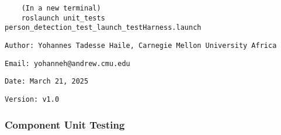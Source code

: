 \documentclass{CSSRforAfrica}
\newcommand{\checkboxChecked}{\fbox{\ding{51}}} %
\begin{document}
\begin{description}
{\begin{verbatim}
    (In a new terminal)
    roslaunch unit_tests person_detection_test_launch_testHarness.launch
\end{verbatim}}

\item[\checkboxChecked] 
 {\small 
\begin{verbatim}
Author: Yohannes Tadesse Haile, Carnegie Mellon University Africa
\end{verbatim}}

\item[\checkboxChecked] 
 {\small 
\begin{verbatim}
Email: yohanneh@andrew.cmu.edu
\end{verbatim}}

\item[\checkboxChecked] 
 {\small 
\begin{verbatim}
Date: March 21, 2025
\end{verbatim}}

\item[\checkboxChecked] 
 {\small 
\begin{verbatim}
Version: v1.0
\end{verbatim}}


\end{description}

\subsubsection{Component Unit Testing}
\label{subsubsection:person_detection_test_unit_testing}
\end{document}
